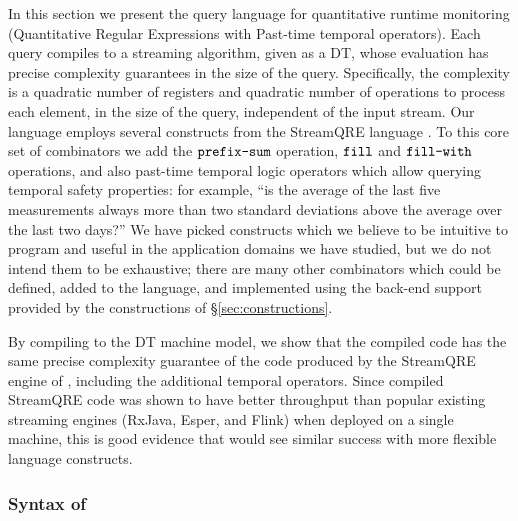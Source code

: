In this section we present the \QREpast{} query language for quantitative runtime monitoring (Quantitative Regular Expressions with Past-time temporal operators). Each query compiles to a streaming algorithm, given as a DT, whose evaluation has precise complexity guarantees in the size of the query. Specifically, the complexity is a quadratic number of registers and quadratic number of operations to process each element, in the size of the query, independent of the input stream. Our language employs several constructs from the StreamQRE language \cite{MRAIK2017SQRE}. To this core set of combinators we add the $\texttt{prefix-sum}$ operation, $\texttt{fill}$ and $\texttt{fill-with}$ operations, and also past-time temporal logic operators which allow querying temporal safety properties: for example, ``is the average of the last five measurements always more than two standard deviations above the average over the last two days?''
We have picked constructs which we believe to be intuitive to program and useful in the application domains we have studied, but we do not intend them to be exhaustive; there are many other combinators which could be defined, added to the language, and implemented using the back-end support provided by the constructions of \S\ref{sec:constructions}.

By compiling to the DT machine model, we show that the compiled code has the same precise complexity guarantee of the code produced by the StreamQRE engine of \cite{MRAIK2017SQRE}, including the additional temporal operators. Since compiled StreamQRE code was shown to have better throughput than popular existing streaming engines (RxJava, Esper, and Flink) when deployed on a single machine, this is good evidence that \QREpast{} would see similar success with more flexible language constructs.

\subsubsection{Syntax of \QREpast}
\label{subsec:rm-syntax}

